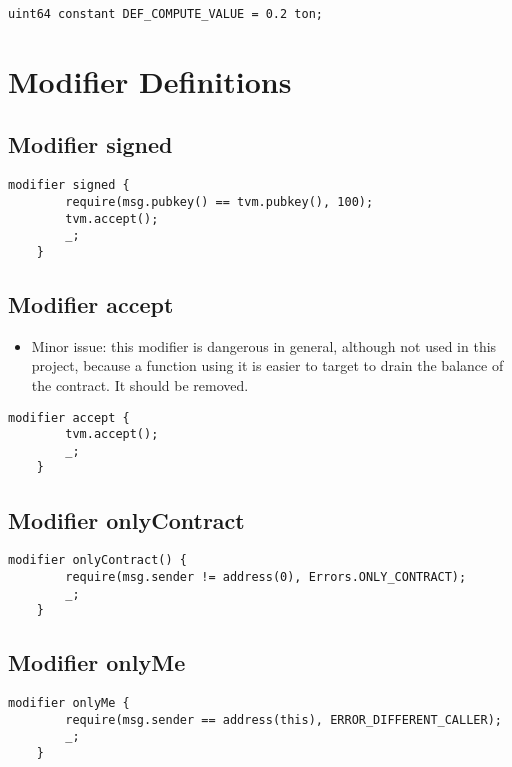 \begin{lstlisting}[firstnumber=30]
    uint64 constant DEF_COMPUTE_VALUE = 0.2 ton;
\end{lstlisting}

\section{Modifier Definitions}


\subsection{Modifier signed}


\begin{lstlisting}[firstnumber=32]
    modifier signed {
        require(msg.pubkey() == tvm.pubkey(), 100);
        tvm.accept();
        _;
    }
\end{lstlisting}

\subsection{Modifier accept}

\begin{itemize}
\item Minor issue: this modifier is dangerous in general, although not
  used in this project, because a function using it is easier to
  target to drain the balance of the contract. It should be removed.
\end{itemize}

\begin{lstlisting}[firstnumber=38]
    modifier accept {
        tvm.accept();
        _;
    }
\end{lstlisting}

\subsection{Modifier onlyContract}


\begin{lstlisting}[firstnumber=43]
    modifier onlyContract() {
        require(msg.sender != address(0), Errors.ONLY_CONTRACT);
        _;
    }
\end{lstlisting}

\subsection{Modifier onlyMe}


\begin{lstlisting}[firstnumber=48]
    modifier onlyMe {
        require(msg.sender == address(this), ERROR_DIFFERENT_CALLER);
        _;
    }
\end{lstlisting}
